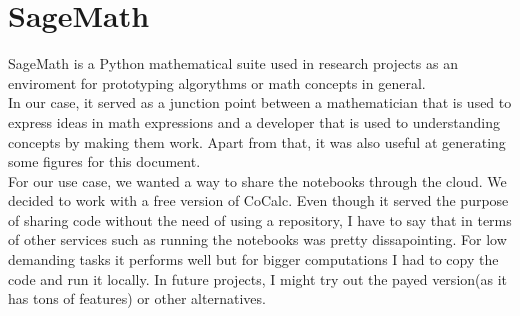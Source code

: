 \section{SageMath}

SageMath\cite{Sage} is a Python mathematical suite used in research projects as
an enviroment for prototyping algorythms or math concepts in general.\\

In our case, it served as a junction point between a mathematician that is used
to express ideas in math expressions and a developer that is used to
understanding concepts by making them work. Apart from that, it was also
useful at generating some figures for this document.\\

For our use case, we wanted a way to share the notebooks through the cloud.
We decided to work with a free version of CoCalc\cite{cocalc}. Even though it
served the purpose of sharing code without the need of using a repository,
I have to say that in terms of other services such as running the notebooks
was pretty dissapointing. For low demanding tasks it performs well but for
bigger computations I had to copy the code and run it locally. In future
projects, I might try out the payed version(as it has tons of features)
or other alternatives.\\
